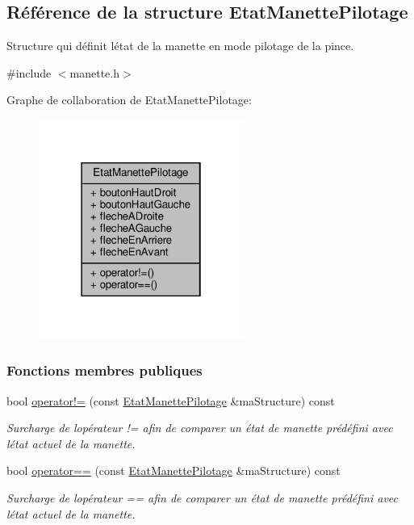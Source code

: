 \hypertarget{struct_etat_manette_pilotage}{}\subsection{Référence de la structure Etat\+Manette\+Pilotage}
\label{struct_etat_manette_pilotage}


Structure qui définit l\textquotesingle{}état de la manette en mode pilotage de la pince.  




{\ttfamily \#include $<$manette.\+h$>$}



Graphe de collaboration de Etat\+Manette\+Pilotage\+:\nopagebreak
\begin{figure}[H]
\begin{center}
\leavevmode
\includegraphics[width=190pt]{struct_etat_manette_pilotage__coll__graph}
\end{center}
\end{figure}
\subsubsection*{Fonctions membres publiques}
\begin{DoxyCompactItemize}
\item 
bool \hyperlink{struct_etat_manette_pilotage_a1a9cbf7891c30ab2503ec9c9b7fb5299}{operator!=} (const \hyperlink{struct_etat_manette_pilotage}{Etat\+Manette\+Pilotage} \&ma\+Structure) const
\begin{DoxyCompactList}\small\item\em Surcharge de l\textquotesingle{}opérateur != afin de comparer un état de manette prédéfini avec l\textquotesingle{}état actuel de la manette. \end{DoxyCompactList}\item 
bool \hyperlink{struct_etat_manette_pilotage_a85cac8d658fdc2d63ac54ea340ec8be8}{operator==} (const \hyperlink{struct_etat_manette_pilotage}{Etat\+Manette\+Pilotage} \&ma\+Structure) const
\begin{DoxyCompactList}\small\item\em Surcharge de l\textquotesingle{}opérateur == afin de comparer un état de manette prédéfini avec l\textquotesingle{}état actuel de la manette. \end{DoxyCompactList}\end{DoxyCompactItemize}
